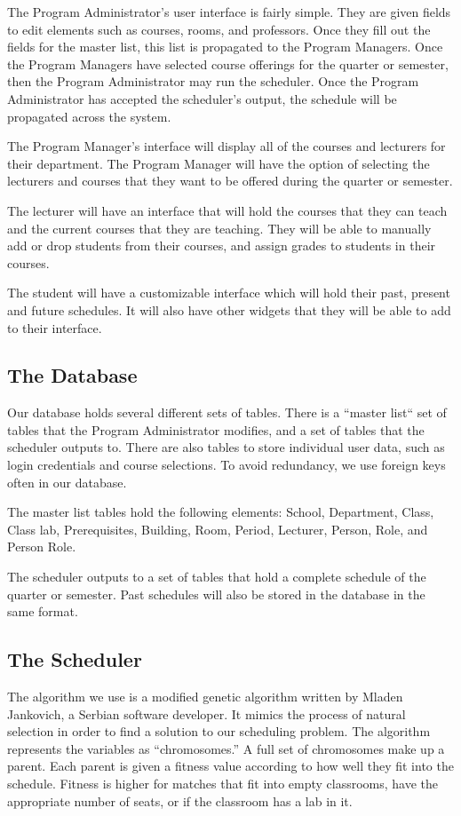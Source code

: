 \documentclass[12pt]{article}
\begin{document}
The Program Administrator's user interface is fairly simple. They are given fields to edit elements such as courses, rooms, and professors. Once they fill out the fields for the master list, this list is propagated to the Program Managers. Once the Program Managers have selected course offerings for the quarter or semester, then the Program Administrator may run the scheduler. Once the Program Administrator has accepted the scheduler's output, the schedule will be propagated across the system.

The Program Manager's interface will display all of the courses and lecturers for their department. The Program Manager will have the option of selecting the lecturers and courses that they want to be offered during the quarter or semester.

The lecturer will have an interface that will hold the courses that they can teach and the current courses that they are teaching. They will be able to manually add or drop students from their courses, and assign grades to students in their courses.

The student will have a customizable interface which will hold their past, present and future schedules. It will also have other widgets that they will be able to add to their interface.

\subsection{The Database}
Our database holds several different sets of tables. There is a ``master list`` set of tables that the Program Administrator modifies, and a set of tables that the scheduler outputs to. There are also tables to store individual user data, such as login credentials and course selections. To avoid redundancy, we use foreign keys often in our database.

The master list tables hold the following elements: School, Department, Class, Class lab, Prerequisites, Building, Room, Period, Lecturer, Person, Role, and Person Role.

The scheduler outputs to a set of tables that hold a complete schedule of the quarter or semester. Past schedules will also be stored in the database in the same format. 


\subsection{The Scheduler}
The algorithm we use is a modified genetic algorithm written by Mladen Jankovich, a Serbian software developer. It mimics the process of natural selection in order to find a solution to our scheduling problem. The algorithm represents the variables as ``chromosomes.'' A full set of chromosomes make up a parent. Each parent is given a fitness value according to how well they fit into the schedule. Fitness is higher for matches that fit into empty classrooms, have the appropriate number of seats, or if the classroom has a lab in it. 
\end{document}
